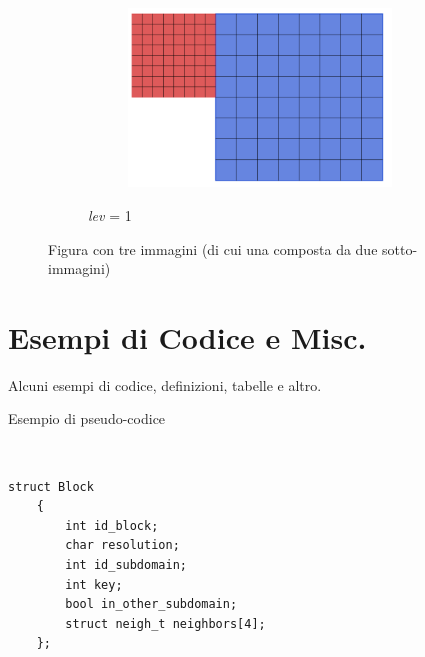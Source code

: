 \begin{figure}[H]
\begin{subfigure}{0.7\textwidth}
\begin{subfigure}{0.5\textwidth}
			\includegraphics[width=0.5\linewidth]{immagini/bloccomaggiore2.png}
		\end{subfigure}
		\caption{\textit{lev} = 1}
				\label{fig:lev1}
	\end{subfigure}
	\caption{Figura con tre immagini (di cui una composta da due sotto-immagini)}
		\label{fig:three}
\end{figure}

\section{Esempi di Codice e Misc.}\label{sec:code}
Alcuni esempi di codice, definizioni, tabelle e altro.

\begin{algorithm}[ht]
	\caption{Esempio di pseudo-codice}
	\label{alg:Prim_Mst}
	\begin{algorithmic}[1]
		\Statex
		\\
		\EndFor
		\EndIf
		\EndFor
		\EndWhile
		\State \Return{}
		\EndFunction
	\end{algorithmic}
\end{algorithm}


\begin{lstlisting}[caption={Esempio di definizione struttura dati C++, ma non algoritmo},
	label={lst:block_struct}]
	struct Block
	{
		int id_block;
		char resolution;
		int id_subdomain;
		int key;
		bool in_other_subdomain;
		struct neigh_t neighbors[4];
	};
\end{lstlisting}



